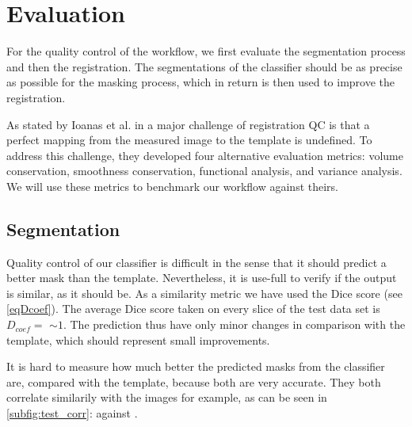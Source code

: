 \section{Evaluation}
For the quality control of the workflow, we first evaluate the segmentation process and then the registration.
The segmentations of the classifier should be as precise as possible for the masking process, which in return is then used to improve the registration.

As stated by Ioanas et al. in \cite{ioanas_optimized_2019} a major challenge of registration QC is that a perfect mapping from the measured image to the template is undefined.
To address this challenge, they developed four alternative evaluation metrics: volume conservation, smoothness conservation, functional analysis, and variance analysis.
We will use these metrics to benchmark our workflow against theirs.

\subsection{Segmentation}
Quality control of our classifier is difficult in the sense that it should predict a better mask than the template.
Nevertheless, it is use-full to verify if the output is similar, as it should be.
As a similarity metric we have used the Dice score (see \cref{eqDcoef}).
The average Dice score taken on every slice of the test data set is $D_{coef}= $  $\sim 1$.
The prediction thus have only minor changes in comparison with the template, which should represent small improvements.


\begin{sansmath}
\end{sansmath}


\iffalse
It is hard to measure how much better the predicted masks from the classifier are, compared with the template, because both are very accurate.
They both correlate similarily with the images for example, as can be seen in \cref{subfig:test_corr}:
 against .

